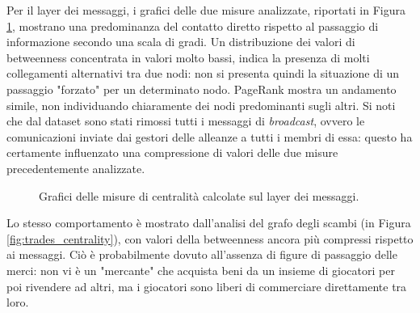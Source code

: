 Per il layer dei messaggi, i grafici delle due misure analizzate, riportati in Figura \ref{fig:messages_centrality}, mostrano una predominanza del contatto diretto rispetto al passaggio di informazione secondo una scala di gradi. Un distribuzione dei valori di betweenness concentrata in valori molto bassi, indica la presenza di molti collegamenti alternativi tra due nodi: non si presenta quindi la situazione di un passaggio "forzato" per un determinato nodo. PageRank mostra un andamento simile, non individuando chiaramente dei nodi predominanti sugli altri. Si noti che dal dataset sono stati rimossi tutti i messaggi di \textit{broadcast}, ovvero le comunicazioni inviate dai gestori delle alleanze a tutti i membri di essa: questo ha certamente influenzato una compressione di valori delle due misure precedentemente analizzate.\\ 
\begin{figure}
	\hfill
	\caption{Grafici delle misure di centralità calcolate sul layer dei messaggi.}
	\label{fig:messages_centrality}
\end{figure}
Lo stesso comportamento è mostrato dall'analisi del grafo degli scambi (in Figura \ref{fig:trades_centrality}), con valori della betweenness ancora più compressi rispetto ai messaggi. Ciò è probabilmente dovuto all'assenza di figure di passaggio delle merci: non vi è un "mercante" che acquista beni da un insieme di giocatori per poi rivendere ad altri, ma i giocatori sono liberi di commerciare direttamente tra loro.
